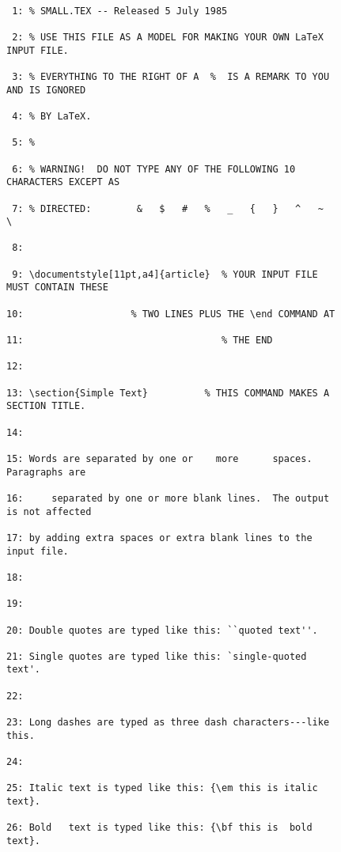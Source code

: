 \begin{figure} %

{\footnotesize\begin{verbatim}

 1: % SMALL.TEX -- Released 5 July 1985

 2: % USE THIS FILE AS A MODEL FOR MAKING YOUR OWN LaTeX INPUT FILE.

 3: % EVERYTHING TO THE RIGHT OF A  %  IS A REMARK TO YOU AND IS IGNORED

 4: % BY LaTeX.

 5: %

 6: % WARNING!  DO NOT TYPE ANY OF THE FOLLOWING 10 CHARACTERS EXCEPT AS

 7: % DIRECTED:        &   $   #   %   _   {   }   ^   ~   \

 8:

 9: \documentstyle[11pt,a4]{article}  % YOUR INPUT FILE MUST CONTAIN THESE

10:                   % TWO LINES PLUS THE \end COMMAND AT

11:                                   % THE END

12:

13: \section{Simple Text}          % THIS COMMAND MAKES A SECTION TITLE.

14:

15: Words are separated by one or    more      spaces.  Paragraphs are

16:     separated by one or more blank lines.  The output is not affected

17: by adding extra spaces or extra blank lines to the input file.

18:

19:

20: Double quotes are typed like this: ``quoted text''.

21: Single quotes are typed like this: `single-quoted text'.

22:

23: Long dashes are typed as three dash characters---like this.

24:

25: Italic text is typed like this: {\em this is italic text}.

26: Bold   text is typed like this: {\bf this is  bold  text}.


\end{verbatim}}
\end{figure}
